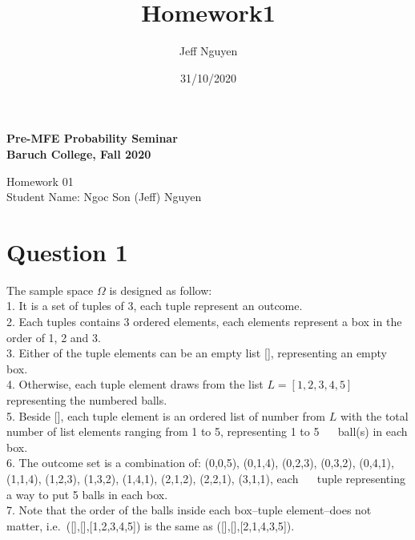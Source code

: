\documentclass[
]{article}
\title{Homework1}
\author{Jeff Nguyen}
\date{31/10/2020}
\begin{document}
\maketitle

\textbf{Pre-MFE Probability Seminar}\\
\textbf{Baruch College, Fall 2020}

Homework 01\\
Student Name: Ngoc Son (Jeff) Nguyen

\hypertarget{question-1}{%
\section{\texorpdfstring{\textbf{Question
1}}{Question 1}}\label{question-1}}

The sample space \(\Omega\) is designed as follow:\\
\hspace*{0.333em} 1. It is a set of tuples of 3, each tuple represent an
outcome.\\
\hspace*{0.333em} 2. Each tuples contains 3 ordered elements, each
elements represent a box in the order of 1, 2 and 3.\\
\hspace*{0.333em} 3. Either of the tuple elements can be an empty list
{[}{]}, representing an empty box.\\
\hspace*{0.333em} 4. Otherwise, each tuple element draws from the list
\(L = [1, 2, 3, 4, 5]\) representing the numbered balls.\\
\hspace*{0.333em} 5. Beside {[}{]}, each tuple element is an ordered
list of number from \(L\) with the total number of list elements ranging
from 1 to 5, representing 1 to 5 ~~ ball(s) in each box.\\
\hspace*{0.333em} 6. The outcome set is a combination of: (0,0,5),
(0,1,4), (0,2,3), (0,3,2), (0,4,1), (1,1,4), (1,2,3), (1,3,2), (1,4,1),
(2,1,2), (2,2,1), (3,1,1), each ~~ tuple representing a way to put 5
balls in each box.\\
\hspace*{0.333em} 7. Note that the order of the balls inside each
box--tuple element--does not matter,
i.e.~({[}{]},{[}{]},{[}1,2,3,4,5{]}) is the same as
({[}{]},{[}{]},{[}2,1,4,3,5{]}).
\end{document}
